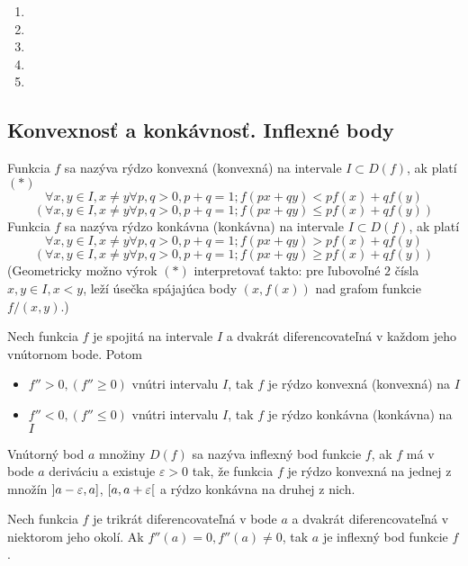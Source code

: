 \begin{enumerate}[resume]
  \item {}
  \item {}
  \item {}
  \item {}
  \item {}
\end{enumerate}

\subsection{Konvexnosť a konkávnosť. Inflexné body}
Funkcia $f$ sa nazýva rýdzo konvexná (konvexná) na intervale $I \subset D(f)$,
ak platí $(*)$
\[
  \forall x,y\in I,x\neq y \forall p,q>0,p+q=1;f(px+qy)<pf(x)+qf(y)
\]
\[
  (\forall x,y\in I,x\neq y \forall p,q>0,p+q=1;f(px+qy)\leq pf(x)+qf(y))
\]
Funkcia $f$ sa nazýva rýdzo konkávna (konkávna) na intervale $I \subset D(f)$,
ak platí
\[
  \forall x,y\in I,x\neq y \forall p,q>0,p+q=1;f(px+qy)>pf(x)+qf(y)
\]
\[
  (\forall x,y\in I,x\neq y \forall p,q>0,p+q=1;f(px+qy)\geq pf(x)+qf(y))
\]
(Geometricky možno výrok $(*)$ interpretovať takto: pre ľubovoľné $2$ čísla
$x,y\in I,x<y$, leží úsečka spájajúca body $(x,f(x))$ nad grafom funkcie
$f/(x,y)$.)

\begin{veta}
Nech funkcia $f$ je spojitá na intervale $I$ a dvakrát diferencovateľná v každom
jeho vnútornom bode. Potom
\begin{itemize}
\item
  $f''>0,(f''\geq 0)$ vnútri intervalu $I$, tak $f$ je rýdzo konvexná (konvexná)
  na $I$
\item
  $f''<0,(f''\leq 0)$ vnútri intervalu $I$, tak $f$ je rýdzo konkávna (konkávna)
  na $I$
\end{itemize}
Vnútorný bod $a$ množiny $D(f)$ sa nazýva inflexný bod funkcie $f$, ak $f$ má v
bode $a$ deriváciu a existuje $\varepsilon >0$ tak, že funkcia $f$ je rýdzo
konvexná na jednej z množín $\interval[open left]{a-\varepsilon}{a}$,
$\interval[open right]{a}{a + \varepsilon}$ a rýdzo konkávna na druhej z nich.
\end{veta}

\begin{veta}
Nech funkcia $f$ je trikrát diferencovateľná v bode $a$ a dvakrát
diferencovateľná v niektorom jeho okolí. Ak $f''(a)=0,f''(a)\neq 0$, tak $a$ je
inflexný bod funkcie $f$.
\end{veta}


